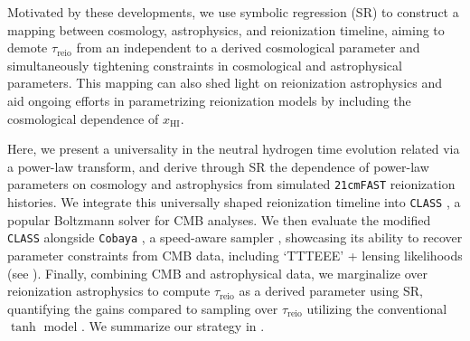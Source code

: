 \documentclass[12pt, a4paper]{article}
\newcommand{\HI}{\mathrm{HI}}
\newcommand{\reio}{\mathrm{reio}}
\begin{document}
Motivated by these developments, we use symbolic regression (SR)
\cite{Cranmer2023, Graham2013} to construct a mapping between cosmology,
astrophysics, and reionization timeline, aiming to demote $\tau_\reio$
from an independent to a derived cosmological parameter and
simultaneously tightening constraints in cosmological and astrophysical
parameters.
This mapping can also shed light on reionization astrophysics and aid
ongoing efforts in parametrizing reionization models \cite{Trac2018,
Trac2022, Paoletti2024} by including the cosmological dependence of
$x_\HI$.

Here, we present a universality in the neutral hydrogen time evolution
related via a power-law transform, and derive through SR the
dependence of power-law parameters on cosmology and astrophysics from
simulated \texttt{21cmFAST} \cite{MesingerEtAl2011, Murray2020}
reionization histories.
We integrate this universally shaped reionization timeline into
\texttt{CLASS} \cite{Blas2011}, a popular Boltzmann solver for CMB
analyses.
We then evaluate the modified \texttt{CLASS} alongside \texttt{Cobaya}
\cite{Torrado2020}, a speed-aware sampler \cite{Lewis2002,
Lewis2013}, showcasing its ability to
recover parameter constraints from CMB data, including `TTTEEE' +
lensing likelihoods \cite{Planck2020c, Planck2020d} (see ).
Finally, combining CMB and astrophysical data, we marginalize over
reionization astrophysics to compute $\tau_\reio$ as a derived parameter
using SR, quantifying the gains compared to sampling over $\tau_\reio$
utilizing the conventional $\tanh$ model \cite{Lewis2008}.
We summarize our strategy in .
\end{document}
